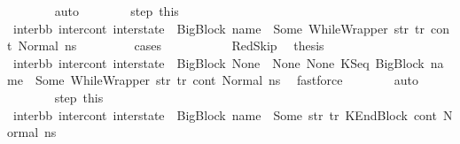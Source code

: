 \begin{isabellebody}
\ \ \ \ \ \ \isamarkupfalse%
\ auto\isanewline
\ \ \ \ \ \ \isamarkupfalse%
\ step{}\ this\ \isamarkupfalse%
\ {\isachardoublequoteopen}{\isacharparenleft}{\kern0pt}inter{\isacharunderscore}{\kern0pt}bb{}{\isacharcomma}{\kern0pt}\ inter{\isacharunderscore}{\kern0pt}cont{}{\isacharcomma}{\kern0pt}\ inter{\isacharunderscore}{\kern0pt}state{}{\isacharparenright}{\kern0pt}\ {\isacharequal}{\kern0pt}\ {\isacharparenleft}{\kern0pt}{\isacharparenleft}{\kern0pt}BigBlock\ name\ {\isacharbrackleft}{\kern0pt}{\isacharbrackright}{\kern0pt}\ {\isacharparenleft}{\kern0pt}Some\ {\isacharparenleft}{\kern0pt}WhileWrapper\ str{\isacharparenright}{\kern0pt}{\isacharparenright}{\kern0pt}\ tr{\isacharparenright}{\kern0pt}{\isacharcomma}{\kern0pt}\ cont{}{\isacharcomma}{\kern0pt}\ Normal\ ns{}{\isacharparenright}{\kern0pt}{\isachardoublequoteclose}\ \isanewline
\ \ \ \ \ \ \isamarkupfalse%
\ cases\ \isanewline
\ \ \ \ \ \ \ \ \isamarkupfalse%
\ RedSkip\ \isamarkupfalse%
\ {\isacharquery}{\kern0pt}thesis\ \ \isamarkupfalse%
\ {\isacartoucheopen}{\isacharparenleft}{\kern0pt}inter{\isacharunderscore}{\kern0pt}bb{\isacharcomma}{\kern0pt}\ inter{\isacharunderscore}{\kern0pt}cont{\isacharcomma}{\kern0pt}\ inter{\isacharunderscore}{\kern0pt}state{\isacharparenright}{\kern0pt}\ {\isacharequal}{\kern0pt}\ {\isacharparenleft}{\kern0pt}BigBlock\ None\ {\isacharbrackleft}{\kern0pt}{\isacharbrackright}{\kern0pt}\ None\ None{\isacharcomma}{\kern0pt}\ {\isacharparenleft}{\kern0pt}KSeq\ {\isacharparenleft}{\kern0pt}BigBlock\ name\ {\isacharbrackleft}{\kern0pt}{\isacharbrackright}{\kern0pt}\ {\isacharparenleft}{\kern0pt}Some\ {\isacharparenleft}{\kern0pt}WhileWrapper\ str{\isacharparenright}{\kern0pt}{\isacharparenright}{\kern0pt}\ tr{\isacharparenright}{\kern0pt}\ cont{}{\isacharparenright}{\kern0pt}{\isacharcomma}{\kern0pt}\ Normal\ ns{}{\isacharparenright}{\kern0pt}{\isacartoucheclose}\ \isamarkupfalse%
\ fastforce\isanewline
\ \ \ \ \ \ \isamarkupfalse%
\ auto\isanewline
\ \ \ \ \ \ \isamarkupfalse%
\ step{}\ this\ \isamarkupfalse%
\ {\isachardoublequoteopen}{\isacharparenleft}{\kern0pt}inter{\isacharunderscore}{\kern0pt}bb{}{\isacharcomma}{\kern0pt}\ inter{\isacharunderscore}{\kern0pt}cont{}{\isacharcomma}{\kern0pt}\ inter{\isacharunderscore}{\kern0pt}state{}{\isacharparenright}{\kern0pt}\ {\isacharequal}{\kern0pt}\ {\isacharparenleft}{\kern0pt}{\isacharparenleft}{\kern0pt}BigBlock\ name\ {\isacharbrackleft}{\kern0pt}{\isacharbrackright}{\kern0pt}\ {\isacharparenleft}{\kern0pt}Some\ str{\isacharparenright}{\kern0pt}\ tr{\isacharparenright}{\kern0pt}{\isacharcomma}{\kern0pt}\ KEndBlock\ cont{}{\isacharcomma}{\kern0pt}\ Normal\ ns{}{\isacharparenright}{\kern0pt}{\isachardoublequoteclose}\isanewline

\end{isabellebody}

